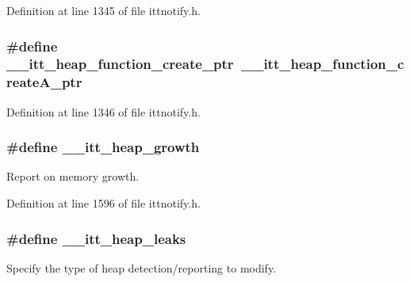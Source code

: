 Definition at line 1345 of file ittnotify.\-h.

\hypertarget{group__heap_gaa1e210ca1b3c31b5ee21996a2d9ed5d7}{
\subsubsection[{\-\_\-\-\_\-itt\-\_\-heap\-\_\-function\-\_\-create\-\_\-ptr}]{\setlength{\rightskip}{0pt plus 5cm}\#define \-\_\-\-\_\-itt\-\_\-heap\-\_\-function\-\_\-create\-\_\-ptr~\-\_\-\-\_\-itt\-\_\-heap\-\_\-function\-\_\-create\-A\-\_\-ptr}}\label{group__heap_gaa1e210ca1b3c31b5ee21996a2d9ed5d7}


Definition at line 1346 of file ittnotify.\-h.

\hypertarget{group__heap_ga2cc49fdf479eba77b24b8ab3d507c5cd}{
\subsubsection[{\-\_\-\-\_\-itt\-\_\-heap\-\_\-growth}]{\setlength{\rightskip}{0pt plus 5cm}\#define \-\_\-\-\_\-itt\-\_\-heap\-\_\-growth}}\label{group__heap_ga2cc49fdf479eba77b24b8ab3d507c5cd}


Report on memory growth. 



Definition at line 1596 of file ittnotify.\-h.

\hypertarget{group__heap_gaaa7b9ac40d4b4111561778090c52ec40}{
\subsubsection[{\-\_\-\-\_\-itt\-\_\-heap\-\_\-leaks}]{\setlength{\rightskip}{0pt plus 5cm}\#define \-\_\-\-\_\-itt\-\_\-heap\-\_\-leaks}}\label{group__heap_gaaa7b9ac40d4b4111561778090c52ec40}


Specify the type of heap detection/reporting to modify. 

